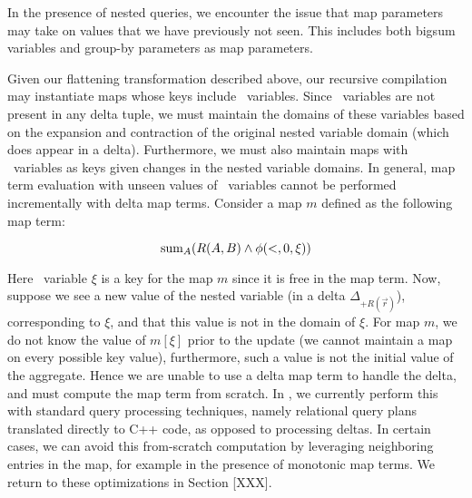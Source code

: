 
In the presence of nested queries, we encounter the issue that map parameters
may take on values that we have previously not seen.
This includes both bigsum variables and group-by parameters as map parameters.

Given our flattening transformation described above, our recursive compilation
may instantiate maps whose keys include \bigsum\ variables. Since \bigsum\
variables are not present in any delta tuple, we must maintain the domains of
these variables based on the expansion and contraction of the original nested
variable domain (which does appear in a delta). Furthermore, we must also
maintain maps with \bigsum\ variables as keys given changes in the nested
variable domains. In general, map term evaluation with unseen values of \bigsum\
variables cannot be performed incrementally with delta map terms. Consider a map
$m$ defined as the following map term:

\[\mathrm{sum}_{A}(R(A,B)\wedge \phi(<, 0, \xi))\]


Here \bigsum\ variable $\xi$ is a key for the map $m$ since it is free in the
map term.
Now, suppose we see a new value of the nested variable (in a delta
$\Delta_{+R(\vec{r})}$), corresponding to $\xi$, and that this value is not in
the domain of $\xi$. For map $m$, we do not know the value of $m[\xi]$ prior to
the update (we cannot maintain a map on every possible key value), furthermore,
such a value is not the initial value of the aggregate. Hence we are unable to
use a delta map term to handle the delta, and must compute the map term from
scratch. In \compiler, we currently perform this with standard query processing
techniques, namely relational query plans translated directly to C++ code, as
opposed to processing deltas. In certain cases, we can avoid this from-scratch
computation by leveraging neighboring entries in the map, for example in the
presence of monotonic map terms. We return to these optimizations in Section
[XXX].


